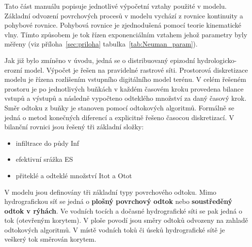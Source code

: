 %

Tato část manuálu popisuje jednotlivé výpočetní vztahy použité v modelu. Základní odvození povrchových procesů v modelu \smod vychází z rovnice kontinuity a pohybové rovnice. Pohybová rovnice je zjednodušená pomocí teorie kinematické vlny. Tímto způsobem je tok řízen exponenciálním vztahem jehož parametry byly měřeny (viz  příloha~\ref{sec:priloha} tabulka~\ref{tab:Neuman_param}). 

Jak již bylo zmíněno v úvodu, jedná se o distribuovaný epizodní hydrologicko-erozní model. Výpočet je řešen na pravidelné rastrové síti. Prostorová diskretizace modelu je řízena  rozlišením vstupního digitálního model terénu. V celém řešeném prostoru je po jednotlivých buňkách v každém časovém kroku provedena bilance vstupů a výstupů a následně vypočteno odteklého množství za daný časový krok. Směr odtoku z buňky je stanoven pomocí odtokových algoritmů. Formálně se jedná o metod konečných diferencí a explicitně řešeno časocou diskretizací. V bilanční rovnici jsou řešený tři základní složky:


\begin{itemize}\itemsep 0cm
\item infiltrace do půdy \acs{Inf}
\item efektivní srážka \acs{ES}
\item přiteklé a odteklé množství \acs{Itot} a \acs{Otot}
\end{itemize}


V modelu jsou definovány tři základní typy povrchového odtoku. Mimo hydrografickou síť se jedná o \textbf{plošný povrchový odtok} nebo \textbf{soustředěný odtok v rýhách}. Ve vodních tocích a dočasné hydrografické síti se pak jedná o tok (otevřeným korytem). V ploše povodí jsou směry odtoků odvozeny na zahladě odtokových algoritmů. V místě vodních toků či úseků hydrografické sítě je veškerý tok směrován korytem.



\newpage



